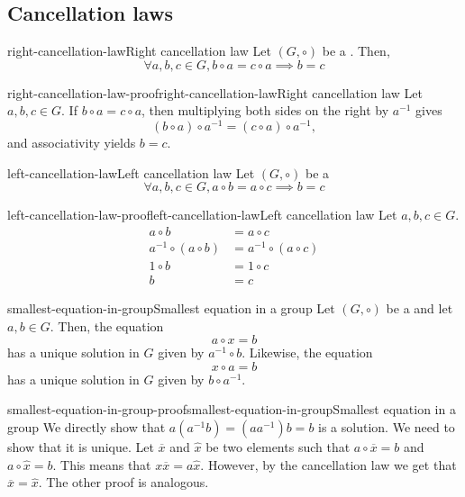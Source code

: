 \documentclass[preview]{standalone}
\begin{document}
\subsection{Cancellation laws}

\begin{snippettheorem}{right-cancellation-law}{Right cancellation law}
    Let \((G, \circ)\) be a \group. Then,
    \[
        \forall a,b,c \in G, b \circ a = c \circ a \implies b = c
    \]
\end{snippettheorem}

\begin{snippetproof}{right-cancellation-law-proof}{right-cancellation-law}{Right cancellation law}
    Let \(a,b,c \in G\).
    If \(b\circ a=c\circ a\), then multiplying both sides on the right by \(a^{-1}\) gives
    \[
        (b\circ a)\circ a^{-1}=(c\circ a)\circ a^{-1},
    \]
    and associativity yields \(b=c\).
\end{snippetproof}

\begin{snippettheorem}{left-cancellation-law}{Left cancellation law}
    Let \((G, \circ)\) be a \group
    \[
        \forall a,b,c \in G, a \circ b = a \circ c \implies b = c
    \]
\end{snippettheorem}

\begin{snippetproof}{left-cancellation-law-proof}{left-cancellation-law}{Left cancellation law}
    Let \(a,b,c \in G\).
    \begin{align*}
        a \circ b &= a \circ c \\
        a^{-1} \circ (a \circ b) &= a^{-1} \circ (a \circ c) \\
        1 \circ b &= 1 \circ c \\
        b &= c
    \end{align*}
\end{snippetproof}

\begin{snippetproposition}{smallest-equation-in-group}{Smallest equation in a group}
    Let \((G, \circ)\) be a \group and let \(a,b \in G\).
    Then, the equation
    \[
        a \circ x = b
    \]
    has a unique solution in \(G\) given by \(a^{-1} \circ b\).
    Likewise, the equation
    \[
        x \circ a = b
    \]
    has a unique solution in \(G\) given by \(b \circ a^{-1}\).
\end{snippetproposition}

\begin{snippetproof}{smallest-equation-in-group-proof}{smallest-equation-in-group}{Smallest equation in a group}
    We directly show that \(a(a^{-1} b) = (aa^{-1})b = b\)
    is a solution. We need to show that it is unique.
    Let \(\overline{x}\) and \(\hat{x}\) be two elements such that
    \(a \circ \overline{x} = b\) and \(a \circ \hat{x} = b\).
    This means that \(x\overline{x} = a\hat{x}\). However, by the cancellation law
    we get that \(\overline{x} = \hat{x}\).
    The other proof is analogous.
\end{snippetproof}
\end{document}
